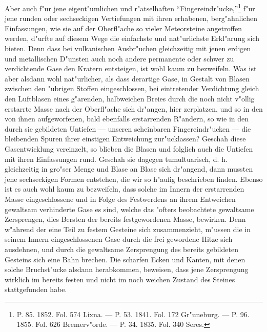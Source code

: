 \documentclass[a4paper, 8pt, oneside, polutonikogreek, german]{article}
\begin{document}
Aber auch f"ur jene eigent"umlichen und r"atselhaften "`Fingereindr"ucke,"'\footnote{P. 85. 1852. Fol. 574 Lixna. — P. 53. 1841. Fol. 172 Gr"uneburg. — P. 96. 1855. Fol. 626 Bremerv"orde. — P. 34. 1835. Fol. 340 Seres.} f"ur jene runden oder sechseckigen Vertiefungen mit ihren erhabenen, berg"ahnlichen Einfassungen, wie sie auf der Oberfl"ache so vieler Meteorsteine angetroffen werden, d"urfte auf diesem Wege die einfachste und nat"urlichste Erkl"arung sich bieten. Denn dass bei vulkanischen Ausbr"uchen gleichzeitig mit jenen erdigen und metallischen D"unsten auch noch andere permanente oder schwer zu verdichtende Gase den Kratern entsteigen, ist wohl kaum zu bezweifeln. Was ist aber alsdann wohl nat"urlicher, als dass derartige Gase, in Gestalt von Blasen zwischen den "ubrigen Stoffen eingeschlossen, bei eintretender Verdichtung gleich den Luftblasen eines g"arenden, halbweichen Breies durch die noch nicht v"ollig erstarrte Masse nach der Oberfl"ache sich dr"angen, hier zerplatzen, und so in den von ihnen aufgeworfenen, bald ebenfalls erstarrenden R"andern, so wie in den durch sie gebildeten Untiefen --- unseren scheinbaren Fingereindr"ucken --- die bleibenden Spuren ihrer einstigen Entweichung zur"ucklassen? Geschah diese Gasentwicklung vereinzelt, so blieben die Blasen und folglich auch die Untiefen mit ihren Einfassungen rund. Geschah sie dagegen tumultuarisch, d. h. gleichzeitig in gro"ser Menge und Blase an Blase sich dr"angend, dann mussten jene sechseckigen Formen entstehen, die wir so h"aufig beschrieben finden. Ebenso ist es auch wohl kaum zu bezweifeln, dass solche im Innern der erstarrenden Masse eingeschlossene und in Folge des Festwerdens an ihrem Entweichen gewaltsam verhinderte Gase es sind, welche das "ofters beobachtete gewaltsame Zersprengen, dies Bersten der bereits festgewordenen Masse, bewirken. Denn w"ahrend der eine Teil zu festem Gesteine sich zusammenzieht, m"ussen die in seinem Innern eingeschlossenen Gase durch die frei gewordene Hitze sich ausdehnen, und durch die gewaltsame Zersprengung des bereits gebildeten Gesteins sich eine Bahn brechen. Die scharfen Ecken und Kanten, mit denen solche Bruchst"ucke alsdann herabkommen, beweisen, dass jene Zersprengung wirklich im bereits festen und nicht im noch weichen Zustand des Steines stattgefunden habe.
\end{document}

